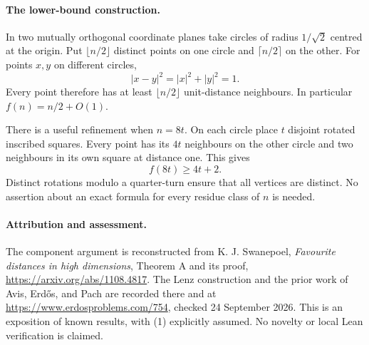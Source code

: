 \paragraph{The lower-bound construction.}
In two mutually orthogonal coordinate planes take circles of radius \(1/\sqrt2\) centred at the origin. Put \(\lfloor n/2\rfloor\) distinct points on one circle and \(\lceil n/2\rceil\) on the other. For points \(x,y\) on different circles,
\[
 |x-y|^2=|x|^2+|y|^2=1.
\]
Every point therefore has at least \(\lfloor n/2\rfloor\) unit-distance neighbours. In particular \(f(n)=n/2+O(1)\).

There is a useful refinement when \(n=8t\). On each circle place \(t\) disjoint rotated inscribed squares. Every point has its \(4t\) neighbours on the other circle and two neighbours in its own square at distance one. This gives
\[
 f(8t)\geq4t+2.
\]
Distinct rotations modulo a quarter-turn ensure that all vertices are distinct. No assertion about an exact formula for every residue class of \(n\) is needed.

\paragraph{Attribution and assessment.}
The component argument is reconstructed from K. J. Swanepoel, \emph{Favourite distances in high dimensions}, Theorem A and its proof, \url{https://arxiv.org/abs/1108.4817}. The Lenz construction and the prior work of Avis, Erd\H{o}s, and Pach are recorded there and at \url{https://www.erdosproblems.com/754}, checked 24 September 2026. This is an exposition of known results, with (1) explicitly assumed. No novelty or local Lean verification is claimed.

